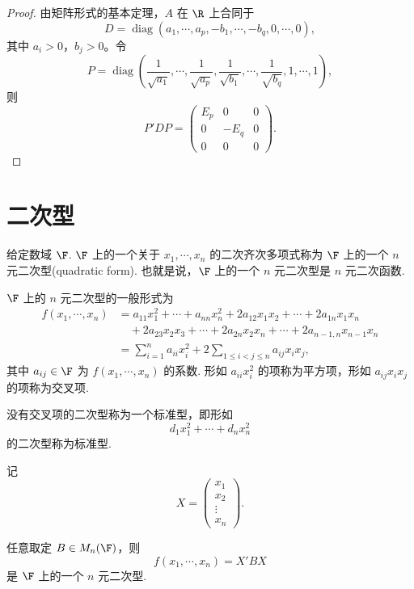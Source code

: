 \begin{proof}
	由矩阵形式的基本定理，$A$ 在 $\R$ 上合同于
	\[
	D=\operatorname{diag}(a_1,\cdots,a_p,-b_1,\cdots,-b_q,0,\cdots,0),
	\]
	其中 $a_i>0$，$b_j>0$。令
	\[
	P=\operatorname{diag}\left(
	\frac1{\sqrt{a_1}},\cdots,\frac1{\sqrt{a_p}},
	\frac1{\sqrt{b_1}},\cdots,\frac1{\sqrt{b_q}},
	1,\cdots,1
	\right),
	\]
	则
	\[
	P'DP=
	\begin{pmatrix}
		E_p&0&0\\
		0&-E_q&0\\
		0&0&0
	\end{pmatrix}.
	\]
\end{proof}
\section{二次型}


\begin{definition}
	给定数域 $\F$. $\F$ 上的一个关于 $x_1,\cdots,x_n$ 的二次齐次多项式称为 $\F$ 上的一个 $n$ 元二次型(quadratic form). 也就是说，$\F$ 上的一个 $n$ 元二次型是 $n$ 元二次函数.
\end{definition}

$\F$ 上的 $n$ 元二次型的一般形式为
\[
\begin{aligned}
	f(x_1,\cdots,x_n)
	&=a_{11}x_1^2+\cdots+a_{nn}x_n^2
	+2a_{12}x_1x_2+\cdots+2a_{1n}x_1x_n \\
	&\quad +2a_{23}x_2x_3+\cdots+2a_{2n}x_2x_n
	+\cdots+2a_{n-1,n}x_{n-1}x_n \\
	&=\sum_{i=1}^n a_{ii}x_i^2+2\sum_{1\le i<j\le n}a_{ij}x_ix_j,
\end{aligned}
\]
其中 $a_{ij}\in\F$ 为 $f(x_1,\cdots,x_n)$ 的系数. 形如 $a_{ii}x_i^2$ 的项称为平方项，形如 $a_{ij}x_ix_j$ 的项称为交叉项.



\begin{definition}
	没有交叉项的二次型称为一个标准型，即形如
	\[
	d_1x_1^2+\cdots+d_nx_n^2
	\]
	的二次型称为标准型.
\end{definition}

记
\[
X=\begin{pmatrix}
	x_1\\x_2\\ \vdots\\x_n
\end{pmatrix}.
\]

\begin{example}
	任意取定 $B\in M_n(\F)$，则
	\[
	f(x_1,\cdots,x_n)=X'BX
	\]
	是 $\F$ 上的一个 $n$ 元二次型.
\end{example}



